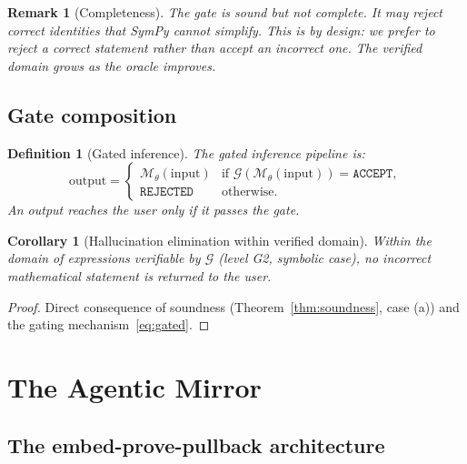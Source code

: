 \documentclass[11pt,a4paper]{article}
\newtheorem{corollary}[theorem]{Corollary}
\newtheorem{definition}[theorem]{Definition}
\newtheorem{remark}[theorem]{Remark}
\newcommand{\cM}{\mathcal{M}}
\newcommand{\cG}{\mathcal{G}}
\begin{document}
\begin{remark}[Completeness]\label{rem:completeness}
The gate is \emph{sound} but not \emph{complete}.
It may reject correct identities that SymPy cannot simplify.
This is by design: we prefer to reject a correct statement
rather than accept an incorrect one.
The verified domain grows as the oracle improves.
\end{remark}

\subsection{Gate composition}

\begin{definition}[Gated inference]\label{def:gated}
The gated inference pipeline is:
\begin{equation}\label{eq:gated}
\text{output} = \begin{cases}
\cM_\theta(\text{input}) & \text{if } \cG(\cM_\theta(\text{input})) = \texttt{ACCEPT}, \\
\texttt{REJECTED} & \text{otherwise}.
\end{cases}
\end{equation}
An output reaches the user only if it passes the gate.
\end{definition}

\begin{corollary}[Hallucination elimination within verified domain]\label{cor:no-hallucination}
Within the domain of expressions verifiable by $\cG$
(level G2, symbolic case), no incorrect mathematical
statement is returned to the user.
\end{corollary}

\begin{proof}
Direct consequence of soundness (Theorem~\ref{thm:soundness},
case (a)) and the gating mechanism~\eqref{eq:gated}.
\end{proof}

\section{The Agentic Mirror}\label{sec:mirror}

\subsection{The embed-prove-pullback architecture}
\end{document}
